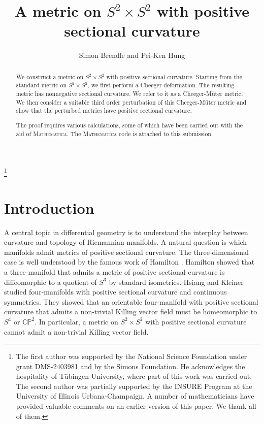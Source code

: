 \documentclass[11pt]{amsart}
\theoremstyle{definition}
\begin{document}
\title{A metric on $S^2 \times S^2$ with positive sectional curvature}
\author{Simon Brendle and Pei-Ken Hung}
\address{Columbia University \\ 2990 Broadway \\ New York NY 10027 \\ USA}
\address{University of Illinois \\ 1409 W. Green Street \\ Urbana IL 61801 \\ USA}
\thanks{The first author was supported by the National Science Foundation under grant DMS-2403981 and by the Simons Foundation. He acknowledges the hospitality of T\"ubingen University, where part of this work was carried out. The second author was partially supported by the INSURE Program at the University of Illinois Urbana-Champaign. A number of mathematicians have provided valuable comments on an earlier version of this paper. We thank all of them.}
\begin{abstract}
We construct a metric on $S^2 \times S^2$ with positive sectional curvature. Starting from the standard metric on $S^2 \times S^2$, we first perform a Cheeger deformation. The resulting metric has nonnegative sectional curvature. We refer to it as a Cheeger-M\"uter metric. We then consider a suitable third order perturbation of this Cheeger-M\"uter metric and show that the perturbed metrics have positive sectional curvature.

The proof requires various calculations, some of which have been carried out with the aid of \textsc{Mathematica}. The \textsc{Mathematica} code is attached to this submission.
\end{abstract}
\maketitle 

\section{Introduction} 

A central topic in differential geometry is to understand the interplay between curvature and topology of Riemannian manifolds. A natural question is which manifolds admit metrics of positive sectional curvature. The three-dimensional case is well understood by the famous work of Hamilton \cite{Hamilton}. Hamilton showed that a three-manifold that admits a metric of positive sectional curvature is diffeomorphic to a quotient of $S^3$ by standard isometries. Hsiang and Kleiner \cite{Hsiang-Kleiner} studied four-manifolds with positive sectional curvature and continuous symmetries. They showed that an orientable four-manifold with positive sectional curvature that admits a non-trivial Killing vector field must be homeomorphic to $S^4$ or $\mathbb{CP}^2$. In particular, a metric on $S^2 \times S^2$ with positive sectional curvature cannot admit a non-trivial Killing vector field.
\end{document}
